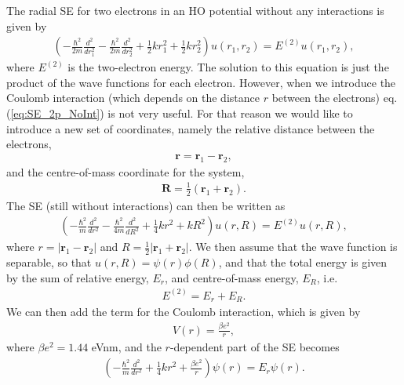 \documentclass[12pt, a4paper]{article}
\begin{document}
The radial SE for two electrons in an HO potential without any interactions is given by 
\begin{align}
\left( - \frac{\hbar^2}{2m}\frac{d^2}{dr_1^2} - \frac{\hbar^2}{2m}\frac{d^2}{dr_2^2} 
	   + \frac{1}{2}kr_1^2 + \frac{1}{2}kr_2^2 \right) u(r_1, r_2) = E^{(2)}u(r_1, r_2), 
\label{eq:SE_2p_NoInt}
\end{align}
where $E^{(2)}$ is the two-electron energy. The solution to this equation is just the product of the 
wave functions for each electron. However, when we introduce the Coulomb interaction (which depends on 
the distance $r$ between the electrons) eq. (\ref{eq:SE_2p_NoInt}) is not very useful. For that reason 
we would like to introduce a new set of coordinates, namely the relative distance between the electrons,  
\begin{align*}
\mathbf{r} = \mathbf{r}_1 - \mathbf{r}_2, 
\end{align*} 
and the centre-of-mass coordinate for the system, 
\begin{align*}
\mathbf{R} = \frac{1}{2}(\mathbf{r}_1 + \mathbf{r}_2). 
\end{align*}
The SE (still without interactions) can then be written as 
\begin{align*}
\left( - \frac{\hbar^2}{m}\frac{d^2}{dr^2} - \frac{\hbar^2}{4m}\frac{d^2}{dR^2} 
	   + \frac{1}{4}kr^2 + kR^2 \right) u(r,R) = E^{(2)}u(r,R),  
\end{align*}
where $r=|\mathbf{r}_1 - \mathbf{r}_2|$ and $R = \frac{1}{2}|\mathbf{r}_1 + \mathbf{r}_2|$. We then 
assume that the wave function is separable, so that $u(r,R) = \psi(r)\phi(R)$, and that the total energy 
is given by the sum of relative energy, $E_r$, and centre-of-mass energy, $E_R$, i.e. 
\begin{align*}
E^{(2)} = E_r + E_R. 
\end{align*}
We can then add the term for the Coulomb interaction, which is given by 
\begin{align*}
V(r) = \frac{\beta e^2}{r}, 
\end{align*}
where $\beta e^2 = 1.44$ eVnm, and the $r$-dependent part of the SE becomes 
\begin{align*}
\left( - \frac{\hbar^2}{m}\frac{d^2}{dr^2} + \frac{1}{4}kr^2 + \frac{\beta e^2}{r} \right) \psi(r) 
= E_r \psi(r).  
\end{align*}
\end{document}
